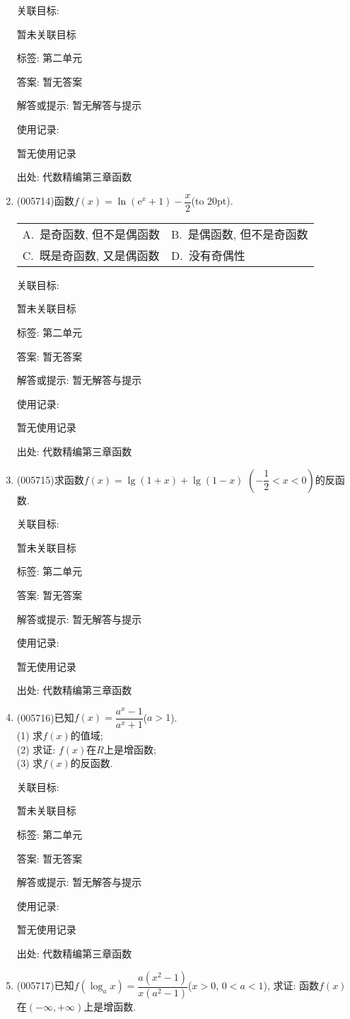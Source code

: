 \documentclass[10pt,a4paper]{article}
\newcommand{\bracket}[1]{(\hbox to #1pt{})}
\newcommand{\twoch}[4]{\par\begin{tabular}{p{.46\textwidth}p{.46\textwidth}}
A.~#1& B.~#2\\
C.~#3& D.~#4
\end{tabular}}
\begin{document}
\begin{enumerate}[1.]
关联目标:

暂未关联目标



标签: 第二单元

答案: 暂无答案

解答或提示: 暂无解答与提示

使用记录:

暂无使用记录


出处: 代数精编第三章函数
\item { (005714)}函数$f(x)=\ln (\mathrm{e}^x+1)-\dfrac x2$\bracket{20}.
\twoch{是奇函数, 但不是偶函数}{是偶函数, 但不是奇函数}{既是奇函数, 又是偶函数}{没有奇偶性}


关联目标:

暂未关联目标



标签: 第二单元

答案: 暂无答案

解答或提示: 暂无解答与提示

使用记录:

暂无使用记录


出处: 代数精编第三章函数
\item { (005715)}求函数$f(x)=\lg (1+x)+\lg (1-x)$ $(-\dfrac 12<x<0)$的反函数.


关联目标:

暂未关联目标



标签: 第二单元

答案: 暂无答案

解答或提示: 暂无解答与提示

使用记录:

暂无使用记录


出处: 代数精编第三章函数
\item { (005716)}已知$f(x)=\dfrac{a^x-1}{a^x+1}$($a>1$).\\
(1) 求$f(x)$的值域;\\
(2) 求证: $f(x)$在$R$上是增函数;\\
(3) 求$f(x)$的反函数.


关联目标:

暂未关联目标



标签: 第二单元

答案: 暂无答案

解答或提示: 暂无解答与提示

使用记录:

暂无使用记录


出处: 代数精编第三章函数
\item { (005717)}已知$f(\log_ax)=\dfrac{a(x^2-1)}{x(a^2-1)}$($x>0$, $0<a<1$), 求证: 函数$f(x)$在$(-\infty ,+\infty)$上是增函数.



\end{enumerate}
\end{document}

